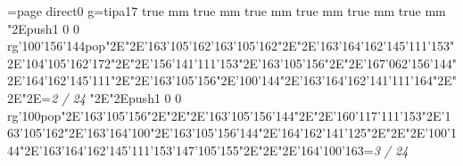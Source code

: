 \chardef\match=\pdfcolorstackinit page direct{0 g}\nopagenumbers\font\ipa=tipa17 true mm true mm true mm true mm true mm true mm
\null\vfill\enskip\enskip\enskip\ipa\char"2E\pdfcolorstack\match push{1 0 0 rg}\ipa\char'100\ipa\char'156\ipa\char'144\pdfcolorstack\match pop{}\ipa\char"2E\enskip\ipa\char"2E\ipa\char'163\ipa\char'105\ipa\char'162\bigskip\ipa\char'163\ipa\char'105\ipa\char'162\ipa\char"2E\enskip\enskip\enskip\ipa\char"2E\ipa\char'163\ipa\char'164\ipa\char'162\ipa\char'145\ipa\char'111\ipa\char'153\bigskip\enskip\enskip\ipa\char"2E\ipa\char'104\ipa\char'105\ipa\char'162\ipa\char'172\ipa\char"2E\enskip\ipa\char"2E\ipa\char'156\ipa\char'141\ipa\char'111\ipa\char'153\ipa\char"2E\ipa\char'163\ipa\char'105\ipa\char'156\ipa\char"2E\enskip\enskip\enskip\ipa\char"2E\ipa\char'167\ipa\char'062\ipa\char'156\ipa\char'144\bigskip\enskip\ipa\char"2E\ipa\char'164\ipa\char'162\ipa\char'145\ipa\char'111\ipa\char"2E\enskip\enskip\ipa\char"2E\ipa\char'163\ipa\char'105\ipa\char'156\ipa\char"2E\ipa\char'100\ipa\char'144\ipa\char"2E\ipa\char'163\ipa\char'164\ipa\char'162\ipa\char'141\ipa\char'111\ipa\char'164\bigskip\enskip\enskip\enskip\ipa\char"2E\enskip\enskip\ipa\char"2E\enskip\enskip\enskip\ipa\char"2E\enskip\enskip\enskip\bigskip\vfill\footline={\hfill\tenrm\it 2 / 24}\eject
\null\vfill\enskip\enskip\enskip\ipa\char"2E\enskip\enskip\enskip\ipa\char"2E\pdfcolorstack\match push{1 0 0 rg}\ipa\char'100\pdfcolorstack\match pop{}\ipa\char"2E\enskip\enskip\enskip\bigskip\ipa\char'163\ipa\char'105\ipa\char'156\ipa\char"2E\enskip\enskip\enskip\ipa\char"2E\enskip\enskip\enskip\enskip\enskip\enskip\bigskip\enskip\enskip\ipa\char"2E\ipa\char'163\ipa\char'105\ipa\char'156\ipa\char'144\ipa\char"2E\enskip\ipa\char"2E\ipa\char'160\ipa\char'117\ipa\char'111\ipa\char'153\ipa\char"2E\ipa\char'163\ipa\char'105\ipa\char'162\ipa\char"2E\ipa\char'163\ipa\char'164\ipa\char'100\ipa\char"2E\ipa\char'163\ipa\char'105\ipa\char'156\ipa\char'144\bigskip\enskip\ipa\char"2E\ipa\char'164\ipa\char'162\ipa\char'141\ipa\char'125\ipa\char"2E\enskip\enskip\ipa\char"2E\enskip\enskip\enskip\ipa\char"2E\ipa\char'100\ipa\char'144\ipa\char"2E\ipa\char'163\ipa\char'164\ipa\char'162\ipa\char'145\ipa\char'111\ipa\char'153\bigskip\ipa\char'147\ipa\char'105\ipa\char'155\ipa\char"2E\enskip\enskip\ipa\char"2E\enskip\enskip\enskip\ipa\char"2E\ipa\char'164\ipa\char'100\ipa\char'163\bigskip\vfill\footline={\hfill\tenrm\it 3 / 24}\eject
